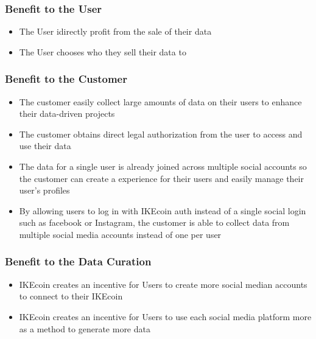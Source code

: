 \documentclass[12pt, letterpaper, twoside]{article}
\begin{document}
\subsubsection*{Benefit to the User}
\begin{itemize}
  \setlength{\itemsep}{1pt}
  \setlength{\parskip}{0pt}
  \setlength{\parsep}{0pt}
  \item The User idirectly profit from the sale of their data
  \item The User chooses who they sell their data to
\end{itemize}

\subsubsection*{Benefit to the Customer}
\begin{itemize}
  \setlength{\itemsep}{1pt}
  \setlength{\parskip}{0pt}
  \setlength{\parsep}{0pt}
  \item The customer easily collect large amounts of data on their users to enhance their data-driven projects
  \item The customer obtains direct legal authorization from the user to access and use their data
  \item The data for a single user is already joined across multiple social accounts so the customer can create a experience for their users and easily manage their user's profiles
  \item By allowing users to log in with IKEcoin auth instead of a single social login such as facebook or Instagram, the customer is able to collect data from multiple social media accounts instead of one per user
\end{itemize}

\subsubsection*{Benefit to the Data Curation}
\begin{itemize}
  \setlength{\itemsep}{1pt}
  \setlength{\parskip}{0pt}
  \setlength{\parsep}{0pt}
  \item IKEcoin creates an incentive for Users to create more social median accounts to connect to their IKEcoin
  \item IKEcoin creates an incentive for Users to use each social media platform more as a method to generate more data
\end{itemize}
\end{document}
